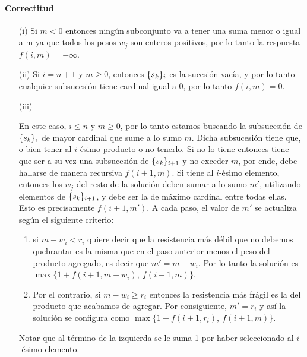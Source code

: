 \documentclass{article}
\DeclarePairedDelimiter\curl{\{}{\}}
\begin{document}
\paragraph{Correctitud}
\begin{enumerate}
    \item[(i)] {Si $m < 0$ entonces ningún subconjunto va a tener una suma menor o igual a m ya que todos los pesos $w_j$ son enteros positivos, por lo tanto la respuesta  $f(i, m) = -\infty$.}
    \item[(ii)] {Si $i = n+1$ y $m \geq 0$, entonces $\curl{s_{k}}_{i}$ es la sucesión vacía, y por lo tanto cualquier subsucesión tiene cardinal igual a 0, por lo tanto $f(i, m) = 0$.}
    \item[(iii)] { En este caso, $i \leq n$ y $m \geq 0$, por lo tanto estamos buscando la subsucesión de $\curl{s_{k}}_{i}$ de mayor cardinal que sume a lo sumo $m$. Dicha subsucesión tiene que, o bien tener al $i$-ésimo producto o no tenerlo. Si no lo tiene entonces tiene que ser a su vez una subsucesión de $\curl{s_{k}}_{i+1}$ y no exceder $m$, por ende, debe hallarse de manera recursiva $f(i+1, m)$. Si tiene al $i$-ésimo elemento, entonces los $w_j$ del resto de la solución deben sumar a lo sumo $m'$, utilizando elementos de $\curl{s_{k}}_{i+1}$, y debe ser la de máximo cardinal entre todas ellas. Esto es precisamente $f(i+1, m')$. A cada paso, el valor de $m'$ se actualiza según el siguiente criterio:
    \begin{enumerate}
       \item {si $m - w_i < r_i$ quiere decir que la resistencia más débil que no debemos quebrantar es la misma que en el paso anterior menos el peso del producto agregado, es decir que $m' = m-w_i$. Por lo tanto la solución es $\max \{ 1 + f(i+1, m - w_i),\ f(i+1, m) \}$}.
       \item {Por el contrario, si $m - w_i \geq r_i$ entonces la resistencia más frágil es la del producto que acabamos de agregar. Por consiguiente, $m' = r_i$ y así la solución se configura como $\max \{ 1 + f(i+1, r_i),\ f(i+1, m) \}$. }
    \end{enumerate} 
    Notar que al término de la izquierda se le suma 1 por haber seleccionado al $i$-ésimo elemento. }
\end{enumerate}
\end{document}
